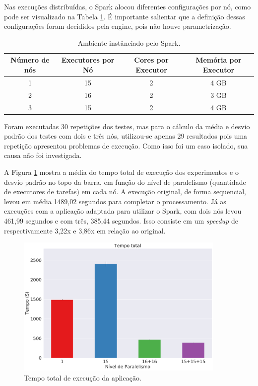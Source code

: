 Nas execuções distribuídas, o Spark alocou diferentes configurações por nó, 
como pode ser visualizado na Tabela \ref{tab:spark_def_config}. É importante 
salientar que a definição dessas configurações foram decididos pela engine, 
pois não houve parametrização.


\begin{table}[H]
\centering
\begin{tabular}{c c c c} \toprule
\textbf{Número de nós}  &  \textbf{Executores por Nó} & \textbf{Cores por 
Executor} & \textbf{Memória por Executor} \\ 
\midrule
1	& 15 & 2 & 4 GB\\
2	& 16 & 2 & 3 GB\\
3	& 15 & 2 & 4 GB\\
\end{tabular}
\caption{Ambiente instânciado pelo Spark.}
\label{tab:spark_def_config}
\end{table}

Foram executadas 30 repetições dos testes, mas para o cálculo da média e desvio 
padrão dos testes com dois e três nós, utilizou-se apenas 29 resultados pois uma 
repetição apresentou problemas de execução. Como isso foi um caso isolado, sua 
causa não foi investigada.

A Figura \ref{fig:total_full} mostra a média do tempo total de execução dos 
experimentos e o desvio padrão no topo da barra, em função do nível de 
paralelismo (quantidade de executores de tarefas) em cada nó. A 
execução original, de forma sequencial, levou em média 1489,02 segundos para 
completar o processamento. Já as execuções com a aplicação adaptada para 
utilizar o Spark, com dois nós levou 461,99 segundos e com três, 385,44 
segundos. Isso consiste em um \emph{speedup} de respectivamente 3,22x e 3,86x em 
relação ao original.


\begin{figure}[ht]
\centerline{
\includegraphics[width=0.9\textwidth]{./img/total.pdf}}
 \caption{Tempo total de execução da aplicação.}
 \label{fig:total_full}
\end{figure}

